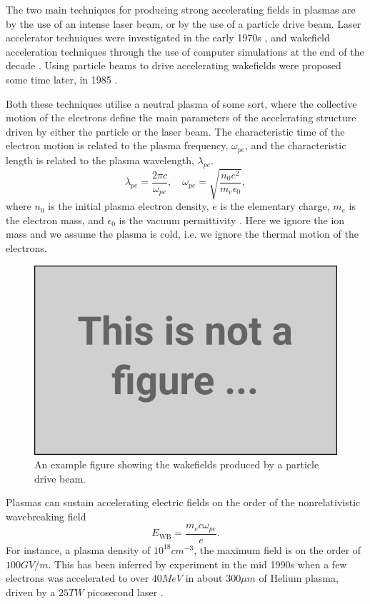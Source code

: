 The two main techniques for producing strong accelerating fields in plasmas are by the use of an intense laser beam, or by the use of a particle drive beam. Laser accelerator techniques were investigated in the early 1970s \cite{chan:1971, palmer:1972}, and wakefield acceleration techniques through the use of computer simulations at the end of the decade \cite{tajima:1979}. Using particle beams to drive accelerating wakefields were proposed some time later, in 1985 \cite{chen:1985}.

Both these techniques utilise a neutral plasma of some sort, where the collective motion of the electrons define the main parameters of the accelerating structure driven by either the particle or the laser beam. The characteristic time of the electron motion is related to the plasma frequency, $\omega_{pe}$, and the characteristic length is related to the plasma wavelength, $\lambda_{pe}$.
\begin{equation}
    \lambda_{pe} = \frac{2\pi c}{\omega_{pe}}, \quad
    \omega_{pe}  = \sqrt{\frac{n_{0}e^{2}}{m_{e}\epsilon_{0}}}, \label{EQ:PWFA:L0W0}
\end{equation}
where $n_{0}$ is the initial plasma electron density, $e$ is the elementary charge, $m_{e}$ is the electron mass, and $\epsilon_{0}$ is the vacuum permittivity \cite{tonks:1929, esarey:1996, pecseli:2012}. Here we ignore the ion mass and we assume the plasma is cold, i.e. we ignore the thermal motion of the electrons.

\begin{figure}[hbt]
    \centering
    \includegraphics[width=0.70\linewidth,trim={0mm 0mm 0mm 0mm},clip]{figures/dummy}
    \caption{\label{Fig:PWFA:Example}
        An example figure showing the wakefields produced by a particle drive beam.}
\end{figure}

Plasmas can sustain accelerating electric fields on the order of the nonrelativistic wavebreaking field \cite{dawson:1959, esarey:1996}
\begin{equation}
    E_{\mathrm{WB}} = \frac{m_{e} c \omega_{pe}}{e}. \label{EQ:EWB}
\end{equation}
For instance, a plasma density of $10^{18}\unit{cm}^{-3}$, the maximum field is on the order of $100\unit{GV/m}$. This has been inferred by experiment in the mid 1990s when a few electrons was accelerated to over $40\unit{MeV}$ in about $300\unit{\mu m}$ of Helium plasma, driven by a $25\unit{TW}$ picosecond laser \cite{modena:1995}.

